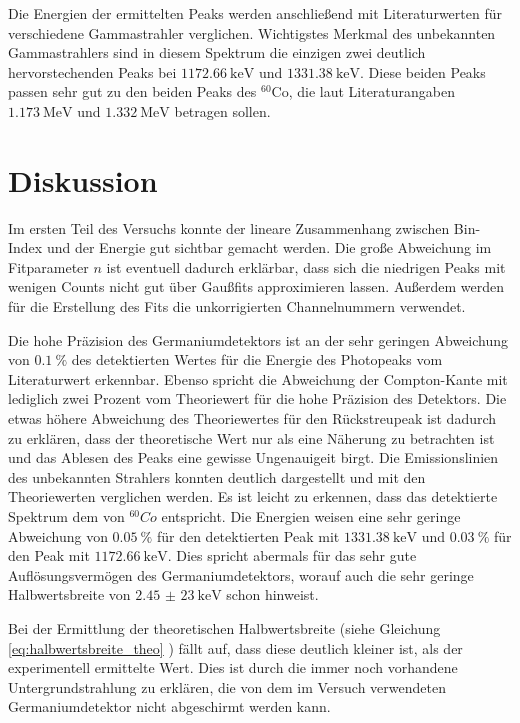 \noindent Die Energien der ermittelten Peaks werden anschließend mit Literaturwerten für verschiedene Gammastrahler verglichen. Wichtigstes Merkmal des unbekannten Gammastrahlers sind in diesem Spektrum die einzigen zwei deutlich hervorstechenden Peaks bei $\SI{1172,66}{\kilo \electronvolt}$ und $\SI{1331,38}{\kilo \electronvolt}$. Diese beiden Peaks passen sehr gut zu den beiden Peaks des $^{60}$Co, die laut Literaturangaben \cite{Q4} $\SI{1,173}{\mega \electronvolt}$ und $\SI{1,332}{\mega \electronvolt}$ betragen sollen.

\section{Diskussion}
Im ersten Teil des Versuchs konnte der lineare Zusammenhang zwischen Bin-Index
und der Energie gut sichtbar gemacht werden.
Die große Abweichung im Fitparameter $n$ ist eventuell dadurch erklärbar, dass
sich die niedrigen Peaks mit wenigen Counts nicht gut über Gaußfits
approximieren lassen. Außerdem werden für die Erstellung des Fits die
unkorrigierten Channelnummern verwendet.

\noindent Die hohe Präzision des Germaniumdetektors ist an der sehr geringen
Abweichung von $\SI{0,1}{\percent}$ des detektierten Wertes für die Energie des
Photopeaks vom Literaturwert \cite{Q3} erkennbar. Ebenso spricht die Abweichung
der Compton-Kante mit lediglich zwei Prozent vom Theoriewert für die hohe
Präzision des Detektors. Die etwas höhere Abweichung des Theoriewertes für den
Rückstreupeak ist dadurch zu erklären, dass der theoretische Wert nur als eine
Näherung zu betrachten ist und das Ablesen des Peaks eine gewisse Ungenauigeit
birgt.
Die Emissionslinien des unbekannten Strahlers konnten deutlich dargestellt und
mit den Theoriewerten verglichen werden. Es ist leicht zu erkennen, dass das
detektierte Spektrum dem von $^{60}Co$ entspricht. Die Energien weisen eine
sehr geringe Abweichung von $\SI{0,05}{\percent}$ für den detektierten Peak mit
$\SI{1331,38}{\kilo \electronvolt}$ und $\SI{0,03}{\percent}$ für den Peak mit
$\SI{1172,66}{\kilo \electronvolt}$. Dies spricht abermals für das sehr gute
Auflösungsvermögen des Germaniumdetektors, worauf auch die sehr geringe Halbwertsbreite von $\SI{2,45(23)}{\kilo \electronvolt}$ schon hinweist.

\noindent Bei der Ermittlung der theoretischen Halbwertsbreite
(siehe Gleichung \ref{eq:halbwertsbreite_theo} ) fällt auf, dass diese deutlich kleiner ist, als
der experimentell ermittelte Wert. Dies ist durch die immer noch vorhandene
Untergrundstrahlung zu erklären, die von dem im Versuch verwendeten
Germaniumdetektor nicht abgeschirmt werden kann.


\printbibliography
